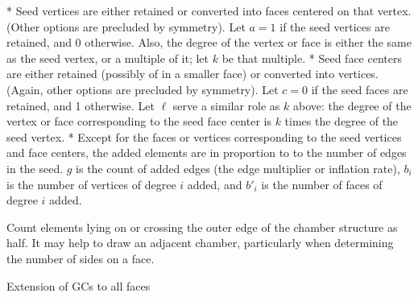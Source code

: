 \documentclass{article}
\begin{document}
* Seed vertices are either retained or converted into faces centered on that
  vertex. (Other options are precluded by symmetry). Let $a = 1$ if the
  seed vertices are retained, and 0 otherwise. Also, the degree of the vertex
  or face is either the same as the seed vertex, or a multiple of it;
  let $k$ be that multiple.
* Seed face centers are either retained (possibly of in a smaller face) or
  converted into vertices. (Again, other options are precluded by symmetry).
  Let $c = 0$ if the seed faces are retained, and 1 otherwise. Let
  $\ell$ serve a similar role as $k$ above: the degree of the vertex
  or face corresponding to the seed face center is $k$ times the degree of
  the seed vertex.
* Except for the faces or vertices corresponding to the seed vertices and face
  centers, the added elements are in proportion to to the number of edges in the
  seed. $g$ is the count of added edges (the edge multiplier or inflation
  rate), $b_i$ is the number of vertices of degree $i$ added, and
  $b'_i$ is the number of faces of degree $i$ added.

Count elements lying on or crossing the outer edge of the chamber structure as
half. It may help to draw an adjacent chamber, particularly when determining
the number of sides on a face.

Extension of GCs to all faces
\end{document}
